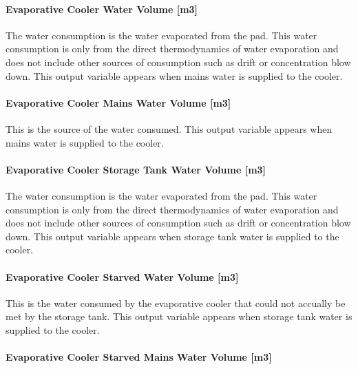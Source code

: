 \paragraph{Evaporative Cooler Water Volume {[}m3{]}}\label{evaporative-cooler-water-volume-m3-1}

The water consumption is the water evaporated from the pad. This water consumption is only from the direct thermodynamics of water evaporation and does not include other sources of consumption such as drift or concentration blow down. This output variable appears when mains water is supplied to the cooler.

\paragraph{Evaporative Cooler Mains Water Volume {[}m3{]}}\label{evaporative-cooler-mains-water-volume-m3-1}

This is the source of the water consumed. This output variable appears when mains water is supplied to the cooler.

\paragraph{Evaporative Cooler Storage Tank Water Volume {[}m3{]}}\label{evaporative-cooler-storage-tank-water-volume-m3-1}

The water consumption is the water evaporated from the pad. This water consumption is only from the direct thermodynamics of water evaporation and does not include other sources of consumption such as drift or concentration blow down. This output variable appears when storage tank water is supplied to the cooler.

\paragraph{Evaporative Cooler Starved Water Volume {[}m3{]}}\label{evaporative-cooler-starved-water-volume-m3-1}

This is the water consumed by the evaporative cooler that could not accually be met by the storage tank. This output variable appears when storage tank water is supplied to the cooler.

\paragraph{Evaporative Cooler Starved Mains Water Volume {[}m3{]}}\label{evaporative-cooler-starved-mains-water-volume-m3-1}


